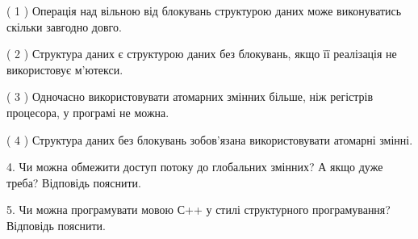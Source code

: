 \documentclass[12pt, ukrainian]{article}
\begin{document}
\begin {large}
{( 1 ) Операція над вільною від блокувань структурою даних може виконуватись скільки завгодно довго.%

( 2 ) Структура даних є структурою даних без блокувань, якщо її реалізація не використовує м’ютекси.%

( 3 ) Одночасно використовувати атомарних змінних більше, ніж регістрів процесора, у програмі не можна.%

( 4 ) Структура даних без блокувань зобов’язана використовувати атомарні змінні.%


\vspace{5mm}
4. Чи можна обмежити доступ потоку до глобальних змінних? А якщо дуже треба? Відповідь пояснити.



\vspace{5mm}
5. Чи можна програмувати мовою С++ у стилі структурного програмування? Відповідь пояснити.
}
\end {large}
\end{document}
